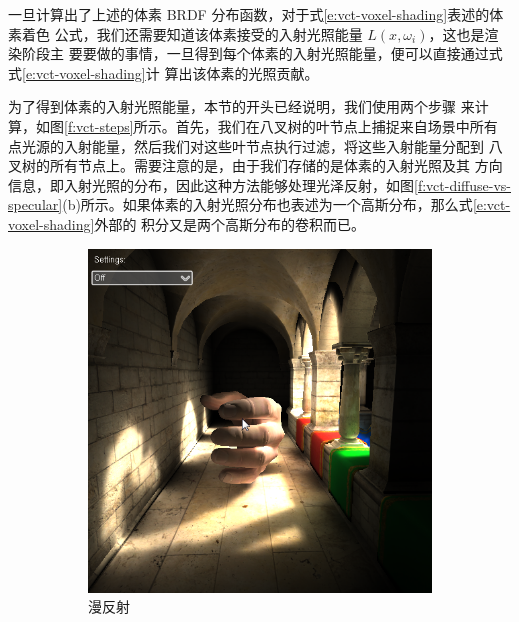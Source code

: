 一旦计算出了上述的体素 BRDF 分布函数，对于式\ref{e:vct-voxel-shading}表述的体素着色 公式，我们还需要知道该体素接受的入射光照能量 $L({x}, \omega_i)$，这也是渲染阶段主 要要做的事情，一旦得到每个体素的入射光照能量，便可以直接通过式式\ref{e:vct-voxel-shading}计 算出该体素的光照贡献。

为了得到体素的入射光照能量，本节的开头已经说明，我们使用两个步骤 来计算，如图\ref{f:vct-steps}所示。首先，我们在八叉树的叶节点上捕捉来自场景中所有 点光源的入射能量，然后我们对这些叶节点执行过滤，将这些入射能量分配到 八叉树的所有节点上。需要注意的是，由于我们存储的是体素的入射光照及其 方向信息，即入射光照的分布，因此这种方法能够处理光泽反射，如图\ref{f:vct-diffuse-vs-specular}(b)所示。如果体素的入射光照分布也表述为一个高斯分布，那么式\ref{e:vct-voxel-shading}外部的 积分又是两个高斯分布的卷积而已。

\begin{figure}
	\begin{subfigure}[b]{0.5\textwidth}
		\includegraphics[width=\textwidth]{figures/vct/vct-14-2}
		\caption{漫反射}
	\end{subfigure}
	\begin{subfigure}[b]{0.5\textwidth}

\end{subfigure}
\end{figure}

